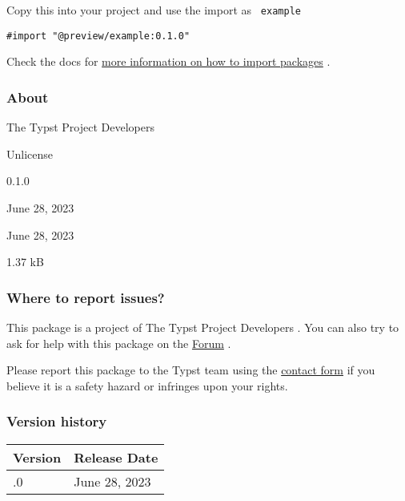 Copy this into your project and use the import as \texttt{\ example\ }

\begin{verbatim}
#import "@preview/example:0.1.0"
\end{verbatim}



Check the docs for
\href{https://typst.app/docs/reference/scripting/\#packages}{more
information on how to import packages} .

\subsubsection{About}\label{about}

\begin{description}
\tightlist
\item[Author :]
The Typst Project Developers
\item[License:]
Unlicense
\item[Current version:]
0.1.0
\item[Last updated:]
June 28, 2023
\item[First released:]
June 28, 2023
\item[Archive size:]
1.37 kB
\href{https://packages.typst.org/preview/example-0.1.0.tar.gz}{\pandocbounded{}}
\end{description}

\subsubsection{Where to report issues?}\label{where-to-report-issues}

This package is a project of The Typst Project Developers . You can also
try to ask for help with this package on the
\href{https://forum.typst.app}{Forum} .

Please report this package to the Typst team using the
\href{https://typst.app/contact}{contact form} if you believe it is a
safety hazard or infringes upon your rights.

\label{versions}
\subsubsection{Version history}\label{version-history}

\begin{longtable}[]{@{}ll@{}}
\toprule\noalign{}
Version & Release Date \\
\midrule\noalign{}
\endhead
\bottomrule\noalign{}
\endlastfoot
0.1.0 & June 28, 2023 \\
\end{longtable}


